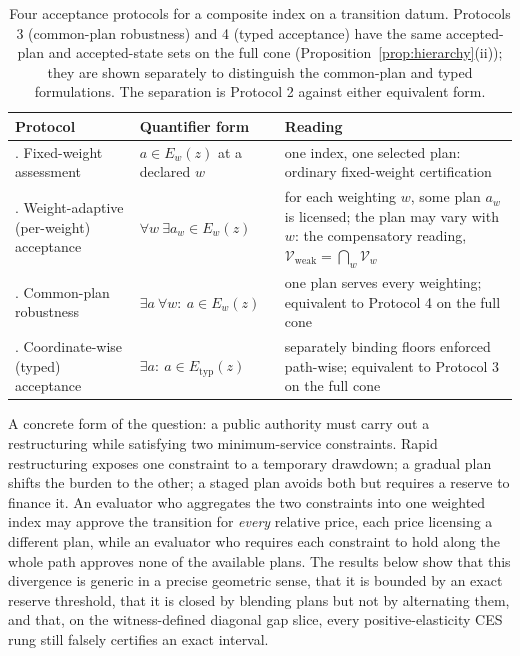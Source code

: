 \documentclass[preprint,11pt,authoryear]{elsarticle}
\theoremstyle{definition}
\theoremstyle{remark}
\newcommand{\Etyp}{E_{\mathrm{typ}}}
\newcommand{\Vweak}{\mathcal{V}_{\mathrm{weak}}}
\begin{document}
\begin{table}[!htbp]
\centering\small
\caption{Four acceptance protocols for a composite index on a transition datum. Protocols 3 (common-plan robustness) and 4 (typed acceptance) have the same accepted-plan and accepted-state sets on the full cone (Proposition~\ref{prop:hierarchy}(ii)); they are shown separately to distinguish the common-plan and typed formulations. The separation is Protocol 2 against either equivalent form.}
\label{tab:protocols}
\begin{tabularx}{\textwidth}{>{\raggedright\arraybackslash}p{} >{\raggedright\arraybackslash}p{} X}
\toprule
Protocol & Quantifier form & Reading \\
\midrule
1. Fixed-weight assessment & $a\in E_w(z)$ at a declared $w$ & one index, one selected plan: ordinary fixed-weight certification \\
2. Weight-adaptive (per-weight) acceptance & $\forall w\ \exists a_w\in E_w(z)$ & for each weighting $w$, some plan $a_w$ is licensed; the plan may vary with $w$: the compensatory reading, $\Vweak=\bigcap_w\mathcal V_w$ \\
3. Common-plan robustness & $\exists a\ \forall w:\ a\in E_w(z)$ & one plan serves every weighting; equivalent to Protocol 4 on the full cone \\
4. Coordinate-wise (typed) acceptance & $\exists a:\ a\in\Etyp(z)$ & separately binding floors enforced path-wise; equivalent to Protocol 3 on the full cone \\
\bottomrule
\end{tabularx}
\end{table}

A concrete form of the question: a public authority must carry out a restructuring while satisfying two minimum-service constraints. Rapid restructuring exposes one constraint to a temporary drawdown; a gradual plan shifts the burden to the other; a staged plan avoids both but requires a reserve to finance it. An evaluator who aggregates the two constraints into one weighted index may approve the transition for \emph{every} relative price, each price licensing a different plan, while an evaluator who requires each constraint to hold along the whole path approves none of the available plans. The results below show that this divergence is generic in a precise geometric sense, that it is bounded by an exact reserve threshold, that it is closed by blending plans but not by alternating them, and that, on the witness-defined diagonal gap slice, every positive-elasticity CES rung still falsely certifies an exact interval.
\end{document}
